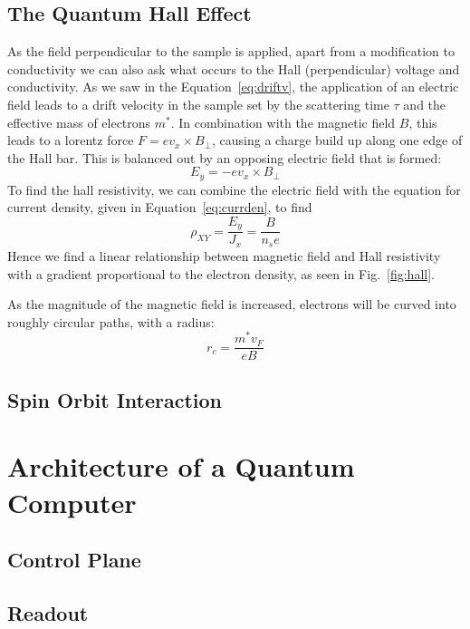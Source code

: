 \subsection{The Quantum Hall Effect}
As the field perpendicular to the sample is applied, apart from a modification to conductivity we can also ask what occurs to the Hall (perpendicular) voltage
and conductivity. As we saw in the Equation~\ref{eq:driftv}, the application of an electric field leads to a drift velocity in the sample set by the scattering
time $\tau$ and the effective mass of electrons $m^*$. In combination with the magnetic field $B$, this leads to a lorentz force $F = e v_x \times B_\perp$, causing
a charge build up along one edge of the Hall bar. This is balanced out by an opposing electric field that is formed:
\begin{equation}
  E_y = -e v_x \times B_\perp
\end{equation}
To find the hall resistivity, we can combine the electric field with the equation for current density, given in Equation~\ref{eq:currden}, to find
\begin{equation}
  \rho_{XY} = \frac{E_y}{J_x} = \frac{B}{n_s e}
\end{equation}
Hence we find a linear relationship between magnetic field and Hall resistivity with a gradient proportional to the electron density, as seen in Fig.~\ref{fig:hall}.

As the magnitude of the magnetic field is increased, electrons will be curved into roughly circular paths, with a radius:
\begin{equation}
  r_c = \frac{m^* v_F}{e B}
\end{equation}

\subsection{Spin Orbit Interaction}

\section{Architecture of a Quantum Computer}
\label{sec:arch}
  \subsection{Control Plane}
  \subsection{Readout}
  \label{sec:readout}